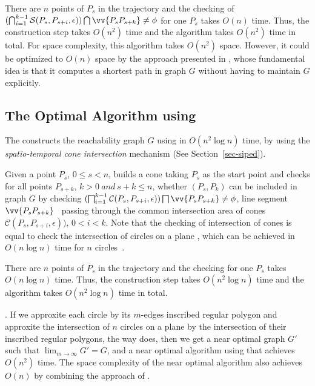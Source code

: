 There are $n$ points of $P_s$ in the trajectory and the checking of $(\bigcap_{i=1}^{k-1}\mathcal{S}(P_s, P_{s+i}, \epsilon)) \bigcap \vv{P_sP_{s+k}} \ne \phi$ for one $P_s$ takes $O(n)$ time.
Thus, the construction step takes $O(n^2)$ time and the algorithm \oped takes $O(n^2)$ time in total.
For space complexity, this algorithm takes $O(n^2)$ space. However, it could be optimized to $O(n)$ space by the approach presented in \cite{Chen:Space}, whose fundamental idea is that it computes a shortest path in graph $G$ without having to maintain $G$ explicitly.


\subsection{The Optimal Algorithm using \sed}
The \osed constructs the reachability graph $G$ using \sed in $O(n^2 \log n)$ time, by using the \textit{spatio-temporal cone intersection} mechanism (See Section~\ref{sec-siped}). 

Given a point $P_s$, $0 \le s < n$, \osed builds a cone taking $P_s$ as the start point and checks for all points $P_{s+k}$, $k>0 ~and~ s+k \le n$, whether $(P_s, P_k)$ can be included in graph $G$ by checking $(\bigsqcap_{i=1}^{k-1}\mathcal{C}(P_s, P_{s+i}, \epsilon)) \bigsqcap \vv{P_sP_{s+k}} \ne \phi$, \ie line segment $\vv{P_sP_{s+k}}$ ~passing through the common intersection area of cones $\mathcal{C}(P_s, P_{s+i}, \epsilon))$, $0<i<k$. Note that the checking of intersection of cones is equal to check the intersection of circles on a plane \cite{Lin:Cised}, which can be achieved in $O(n \log n)$ time for $n$ circles~\cite{Shamos:Circle}. 

There are $n$ points of $P_s$ in the trajectory and the checking for one $P_s$ takes $O(n \log n)$ time.
Thus, the construction step takes $O(n^2 \log n)$ time and the algorithm \osed takes $O(n^2 \log n)$ time in total.

.
If we approxite each circle by its $m$-edges inscribed regular polygon and approxite the intersection of $n$ circles on a plane by the intersection of their inscribed regular polygons, the way \cised does, then we get a near optimal graph $G'$ such that $\lim_{m \to \infty}{G'=G}$, and a near optimal \lsa algorithm using \sed that achieves $O(n^2)$ time. The space complexity of the near optimal algorithm also achieves $O(n)$ by combining the approach of \cite{Chen:Space}.
 